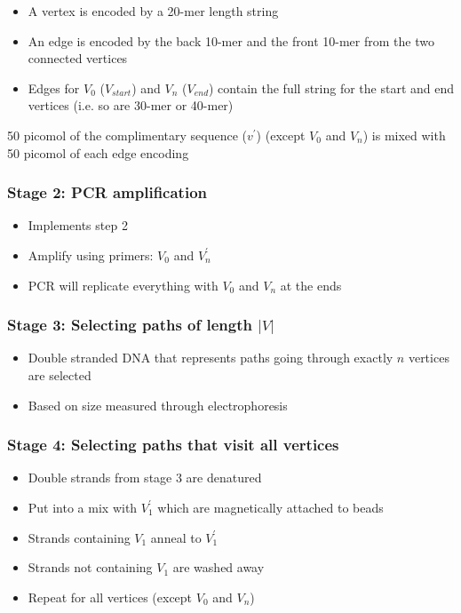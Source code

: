 \documentclass[a4paper]{article}
\begin{document}

\begin{itemize}
  \item A vertex is encoded by a 20-mer length string
  \item An edge is encoded by the back 10-mer and the front 10-mer from the two
        connected vertices
  \item Edges for $V_{0}$ ($V_{start}$) and $V_{n}$ ($V_{end}$) contain the full
        string for the start and end vertices (i.e. so are 30-mer or 40-mer)
\end{itemize}


50 picomol of the complimentary sequence ($v^{\prime}$) (except $V_{0}$ and
$V_{n}$) is mixed with 50 picomol of each edge encoding

\subsubsection{Stage 2: PCR amplification}

\begin{itemize}
  \item Implements step 2
  \item Amplify using primers: $V_{0}$ and $V^{\prime}_{n}$
  \item PCR will replicate everything with $V_{0}$ and $V_{n}$ at the ends
\end{itemize}

\subsubsection{Stage 3: Selecting paths of length $|V|$}

\begin{itemize}
  \item Double stranded DNA that represents paths going through exactly $n$
        vertices are selected
  \item Based on size measured through electrophoresis
\end{itemize}

\subsubsection{Stage 4: Selecting paths that visit all vertices}

\begin{itemize}
  \item Double strands from stage 3 are denatured
  \item Put into a mix with $V^{\prime}_{1}$ which are magnetically attached to
        beads
  \item Strands containing $V_{1}$ anneal to $V^{\prime}_{1}$
  \item Strands not containing $V_{1}$ are washed away
  \item Repeat for all vertices (except $V_{0}$ and $V_{n}$)
\end{itemize}
\end{document}
